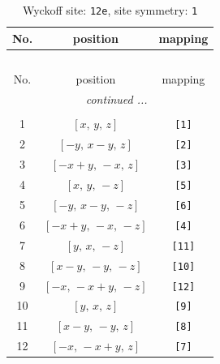 \documentclass[fleqn,8pt]{jsarticle}
\begin{document}
\begin{longtable}{ccc}
\caption{Wyckoff site: {\tt 12e}, site symmetry: {\tt 1}}
 \\
 \hline \hline
No. & position & mapping \\ \hline \endfirsthead

\multicolumn{2}{l}{\tablename\ \thetable{}} \\
 \hline \hline
No. & position & mapping \\ \hline \endhead

 \hline \hline
\multicolumn{2}{r}{\footnotesize\it continued ...} \\ \endfoot

 \hline \hline
\multicolumn{2}{r}{} \\ \endlastfoot

1 & $\left[ x,\, y,\, z \right]$ & {\tt [1]} \\ \hline
2 & $\left[ - y,\, x - y,\, z \right]$ & {\tt [2]} \\ \hline
3 & $\left[ - x + y,\, - x,\, z \right]$ & {\tt [3]} \\ \hline
4 & $\left[ x,\, y,\, - z \right]$ & {\tt [5]} \\ \hline
5 & $\left[ - y,\, x - y,\, - z \right]$ & {\tt [6]} \\ \hline
6 & $\left[ - x + y,\, - x,\, - z \right]$ & {\tt [4]} \\ \hline
7 & $\left[ y,\, x,\, - z \right]$ & {\tt [11]} \\ \hline
8 & $\left[ x - y,\, - y,\, - z \right]$ & {\tt [10]} \\ \hline
9 & $\left[ - x,\, - x + y,\, - z \right]$ & {\tt [12]} \\ \hline
10 & $\left[ y,\, x,\, z \right]$ & {\tt [9]} \\ \hline
11 & $\left[ x - y,\, - y,\, z \right]$ & {\tt [8]} \\ \hline
12 & $\left[ - x,\, - x + y,\, z \right]$ & {\tt [7]} \\
\end{longtable}
\end{document}
